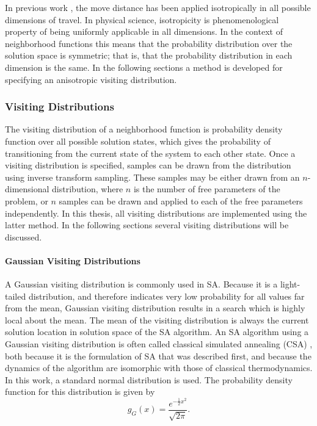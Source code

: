 \documentclass[11pt]{afthesis}
\begin{document}
	In previous work \cite{tsallis1996generalizedsimulatedannealing}, the move distance has been applied isotropically in all possible dimensions of travel. In physical science, isotropicity is phenomenological property of being uniformly applicable in all dimensions. In the context of neighborhood functions this means that the probability distribution over the solution space is symmetric; that is, that the probability distribution in each dimension is the same. In the following sections a method is developed for specifying an anisotropic visiting distribution.
	
	
	\subsubsection{Visiting Distributions}

	
	The visiting distribution of a neighborhood function is probability density function over all possible solution states, which gives the probability of transitioning from the current state of the system to each other state. Once a visiting distribution is specified, samples can be drawn from the distribution using inverse transform sampling. These samples may be either drawn from an $n$-dimensional distribution, where $n$ is the number of free parameters of the problem, or $n$ samples can be drawn and applied to each of the free parameters independently. In this thesis, all visiting distributions are implemented using the latter method. In the following sections several visiting distributions will be discussed.
	
	\label{scn:visiting_distributions}
	
	\paragraph{Gaussian Visiting Distributions}
	\label{scn:classical_visiting}
	
	A Gaussian visiting distribution is commonly used in SA. Because it is a light-tailed distribution, and therefore indicates very low probability for all values far from the mean, Gaussian visiting distribution results in a search which is highly local about the mean. The mean of the visiting distribution is always the current solution location in solution space of the SA algorithm. An SA algorithm using a Gaussian visiting distribution is often called classical simulated annealing (CSA) \cite{tsallis1996generalizedsimulatedannealing}, both because it is the formulation of SA that was described first, and because the dynamics of the algorithm are isomorphic with those of classical thermodynamics. In this work, a standard normal distribution is used. The probability density function for this distribution is given by 
	\begin{equation}
	g_G(x) = \frac{e^{-\frac{1}{2} x^2}}{\sqrt{2\pi}}.
	\label{eq:normal_pdf}
	\end{equation}
	
\end{document}
